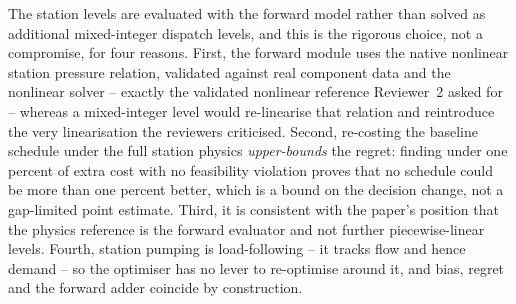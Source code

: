 \documentclass[a4paper,fleqn]{cas-dc}
\begin{document}
The station levels are evaluated with the forward model rather than solved as additional
mixed-integer dispatch levels, and this is the rigorous choice, not a compromise, for four
reasons. First, the forward module uses the native nonlinear station pressure relation,
validated against real component data and the nonlinear solver -- exactly the validated
nonlinear reference Reviewer~2 asked for -- whereas a mixed-integer level would re-linearise
that relation and reintroduce the very linearisation the reviewers criticised. Second,
re-costing the baseline schedule under the full station physics \emph{upper-bounds} the regret:
finding under one percent of extra cost with no feasibility violation proves that no schedule
could be more than one percent better, which is a bound on the decision change, not a
gap-limited point estimate. Third, it is consistent with the paper's position that the physics
reference is the forward evaluator and not further piecewise-linear levels. Fourth, station
pumping is load-following -- it tracks flow and hence demand -- so the optimiser has no lever to
re-optimise around it, and bias, regret and the forward adder coincide by construction.
\end{document}
